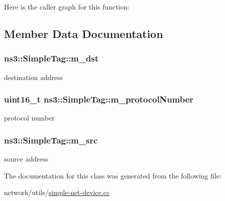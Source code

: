 Here is the caller graph for this function\+:




\subsection{Member Data Documentation}
\subsubsection[{\texorpdfstring{m\+\_\+dst}{m_dst}}]{ ns3\+::\+Simple\+Tag\+::m\+\_\+dst\hspace{0.3cm}{\ttfamily [private]}}\hypertarget{classns3_1_1SimpleTag_a274838a625af595eb1e15dbf58415d80}{}\label{classns3_1_1SimpleTag_a274838a625af595eb1e15dbf58415d80}


destination address 

\subsubsection[{\texorpdfstring{m\+\_\+protocol\+Number}{m_protocolNumber}}]{\setlength{\rightskip}{0pt plus 5cm}uint16\+\_\+t ns3\+::\+Simple\+Tag\+::m\+\_\+protocol\+Number\hspace{0.3cm}{\ttfamily [private]}}\hypertarget{classns3_1_1SimpleTag_a3af52bc0388404c543ab680733512f79}{}\label{classns3_1_1SimpleTag_a3af52bc0388404c543ab680733512f79}


protocol number 

\subsubsection[{\texorpdfstring{m\+\_\+src}{m_src}}]{ ns3\+::\+Simple\+Tag\+::m\+\_\+src\hspace{0.3cm}{\ttfamily [private]}}\hypertarget{classns3_1_1SimpleTag_a912a8d6c2e5cd521027b914dbdb87782}{}\label{classns3_1_1SimpleTag_a912a8d6c2e5cd521027b914dbdb87782}


source address 



The documentation for this class was generated from the following file\+:\begin{DoxyCompactItemize}
\item 
network/utils/\hyperlink{simple-net-device_8cc}{simple-\/net-\/device.\+cc}\end{DoxyCompactItemize}
